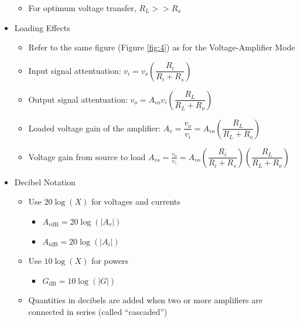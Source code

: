 \begin{itemize}
\begin{itemize}
      \item For optimum voltage transfer, $R_L>>R_o$

    \end{itemize}

  \item Loading Effects

    \begin{itemize}

      \item Refer to the same figure (Figure \ref{fig:4}) as for the Voltage-Amplifier Mode

      \item Input signal attentuation: $v_i=v_s\left( \dfrac{R_i}{R_i+R_s} \right)$

      \item Output signal attentuation: $v_o=A_{vo}v_i\left( \dfrac{R_L}{R_L+R_o} \right)$

      \item Loaded voltage gain of the amplifier: $A_v=\dfrac{v_o}{v_i}=A_{vo}\left( \dfrac{R_L}{R_L+R_o} \right)$

      \item Voltage gain from source to load $A_{vs}=\frac{v_o}{v_s}=A_{vo}\left( \dfrac{R_i}{R_i+R_s} \right)\left( \dfrac{R_L}{R_L+R_o} \right)$

    \end{itemize}

  \item Decibel Notation

    \begin{itemize}

      \item Use $20\log(X)$ for voltages and currents

        \begin{itemize}

          \item $A_{v\text{dB}}=20\log(|A_v|)$

          \item $A_{i\text{dB}}=20\log(|A_i|)$

        \end{itemize}

      \item Use $10\log(X)$ for powers

        \begin{itemize}

          \item $G_{\text{dB}}=10\log(|G|)$

        \end{itemize}

      \item Quantities in decibels are added when two or more amplifiers are connected in series (called ``cascaded'')

    \end{itemize}

\end{itemize}



